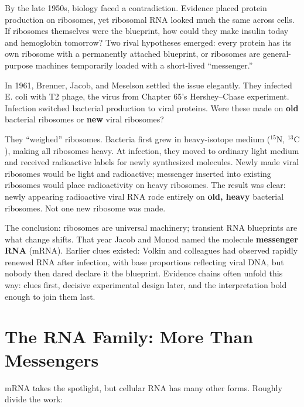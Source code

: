 \begin{zhengju}
By the late 1950s, biology faced a contradiction. Evidence placed protein production on ribosomes, yet ribosomal RNA looked much the same across cells. If ribosomes themselves were the blueprint, how could they make insulin today and hemoglobin tomorrow? Two rival hypotheses emerged: every protein has its own ribosome with a permanently attached blueprint, or ribosomes are general-purpose machines temporarily loaded with a short-lived ``messenger.''

In 1961, Brenner, Jacob, and Meselson settled the issue elegantly. They infected E. coli with T2 phage, the virus from Chapter 65's Hershey--Chase experiment. Infection switched bacterial production to viral proteins. Were these made on \textbf{old} bacterial ribosomes or \textbf{new} viral ribosomes?

They ``weighed'' ribosomes. Bacteria first grew in heavy-isotope medium ($^{15}\mathrm{N}$, $^{13}\mathrm{C}$), making all ribosomes heavy. At infection, they moved to ordinary light medium and received radioactive labels for newly synthesized molecules. Newly made viral ribosomes would be light and radioactive; messenger inserted into existing ribosomes would place radioactivity on heavy ribosomes. The result was clear: newly appearing radioactive viral RNA rode entirely on \textbf{old, heavy} bacterial ribosomes. Not one new ribosome was made.

The conclusion: ribosomes are universal machinery; transient RNA blueprints are what change shifts. That year Jacob and Monod named the molecule \textbf{messenger RNA} (mRNA). Earlier clues existed: Volkin and colleagues had observed rapidly renewed RNA after infection, with base proportions reflecting viral DNA, but nobody then dared declare it the blueprint. Evidence chains often unfold this way: clues first, decisive experimental design later, and the interpretation bold enough to join them last.
\end{zhengju}

\section{The RNA Family: More Than Messengers}

mRNA takes the spotlight, but cellular RNA has many other forms. Roughly divide the work:

